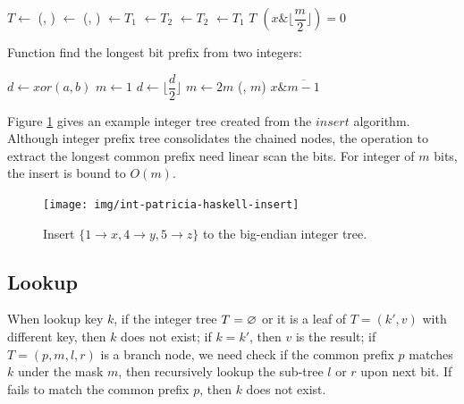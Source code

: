\documentclass[b5paper]{article}
\begin{document}
\begin{algorithmic}[1]
  \State $T \gets$ 
  \State (, ) $\gets$ (, )
    \State {} $\gets T_1$
    \State {} $\gets T_2$
  \Else
    \State {} $\gets T_2$
    \State {} $\gets T_1$
  \EndIf
  \State \Return $T$
\EndFunction
\Statex
{}
  \State \Return $(x \& \lfloor \dfrac{m}{2} \rfloor) = 0$
\EndFunction
\end{algorithmic}

Function  find the longest bit prefix from two integers:

\begin{algorithmic}[1]
  \State $d \gets xor(a, b)$
  \State $m \gets 1$
    \State $d \gets \lfloor \dfrac{d}{2} \rfloor$
    \State $m \gets 2m$
  \EndWhile
  \State \Return (, $m$)
\EndFunction
\Statex
{}
  \State \Return $x \& \overline{m - 1}$
\EndFunction
\Statex
\end{algorithmic}

Figure \ref{fig:int-patricia-haskell-insert} gives an example integer tree created from the $insert$ algorithm. Although integer prefix tree consolidates the chained nodes, the operation to extract the longest common prefix need linear scan the bits. For integer of $m$ bits, the insert is bound to $O(m)$.

\begin{figure}[htbp]
  \centering
  \texttt{[image: img/int-patricia-haskell-insert]}
  \caption{Insert $\{1 \rightarrow x, 4 \rightarrow y, 5 \rightarrow z\}$ to the big-endian integer tree.}
  \label{fig:int-patricia-haskell-insert}
\end{figure}


\subsection{Lookup}

When lookup key $k$, if the integer tree $T = \varnothing$ or it is a leaf of $T = (k', v)$ with different key, then $k$ does not exist; if $k = k'$, then $v$ is the result; if $T = (p, m, l, r)$ is a branch node, we need check if the common prefix $p$ matches $k$ under the mask $m$, then recursively lookup the sub-tree $l$ or $r$ upon next bit. If fails to match the common prefix $p$, then $k$ does not exist.
\end{document}
